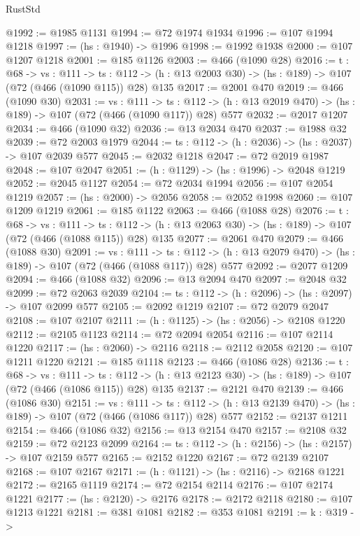 \begin{lexlean}{RustStd}
\begin{coremodule}
{\begin{coremodule}
{{{{@1992 := @1985 @1131
@1994 := @72 @1974 @1934
@1996 := @107 @1994 @1218
@1997 := (hs : @1940) -> @1996
@1998 := @1992 @1938
@2000 := @107 @1207 @1218
@2001 := @185 @1126
@2003 := @466 (@1090 @28)
@2016 := {t : @68} ->
  {vs : @111} ->
  {ts : @112} -> (h : @13 @2003 @30) -> (hs : @189) -> @107 (@72 (@466 (@1090 @115)) @28) @135
@2017 := @2001 @470
@2019 := @466 (@1090 @30)
@2031 := {vs : @111} ->
  {ts : @112} -> (h : @13 @2019 @470) -> (hs : @189) -> @107 (@72 (@466 (@1090 @117)) @28) @577
@2032 := @2017 @1207
@2034 := @466 (@1090 @32)
@2036 := @13 @2034 @470
@2037 := @1988 @32
@2039 := @72 @2003 @1979
@2044 := {ts : @112} -> (h : @2036) -> (hs : @2037) -> @107 @2039 @577
@2045 := @2032 @1218
@2047 := @72 @2019 @1987
@2048 := @107 @2047
@2051 := (h : @1129) -> (hs : @1996) -> @2048 @1219
@2052 := @2045 @1127
@2054 := @72 @2034 @1994
@2056 := @107 @2054 @1219
@2057 := (hs : @2000) -> @2056
@2058 := @2052 @1998
@2060 := @107 @1209 @1219
@2061 := @185 @1122
@2063 := @466 (@1088 @28)
@2076 := {t : @68} ->
  {vs : @111} ->
  {ts : @112} -> (h : @13 @2063 @30) -> (hs : @189) -> @107 (@72 (@466 (@1088 @115)) @28) @135
@2077 := @2061 @470
@2079 := @466 (@1088 @30)
@2091 := {vs : @111} ->
  {ts : @112} -> (h : @13 @2079 @470) -> (hs : @189) -> @107 (@72 (@466 (@1088 @117)) @28) @577
@2092 := @2077 @1209
@2094 := @466 (@1088 @32)
@2096 := @13 @2094 @470
@2097 := @2048 @32
@2099 := @72 @2063 @2039
@2104 := {ts : @112} -> (h : @2096) -> (hs : @2097) -> @107 @2099 @577
@2105 := @2092 @1219
@2107 := @72 @2079 @2047
@2108 := @107 @2107
@2111 := (h : @1125) -> (hs : @2056) -> @2108 @1220
@2112 := @2105 @1123
@2114 := @72 @2094 @2054
@2116 := @107 @2114 @1220
@2117 := (hs : @2060) -> @2116
@2118 := @2112 @2058
@2120 := @107 @1211 @1220
@2121 := @185 @1118
@2123 := @466 (@1086 @28)
@2136 := {t : @68} ->
  {vs : @111} ->
  {ts : @112} -> (h : @13 @2123 @30) -> (hs : @189) -> @107 (@72 (@466 (@1086 @115)) @28) @135
@2137 := @2121 @470
@2139 := @466 (@1086 @30)
@2151 := {vs : @111} ->
  {ts : @112} -> (h : @13 @2139 @470) -> (hs : @189) -> @107 (@72 (@466 (@1086 @117)) @28) @577
@2152 := @2137 @1211
@2154 := @466 (@1086 @32)
@2156 := @13 @2154 @470
@2157 := @2108 @32
@2159 := @72 @2123 @2099
@2164 := {ts : @112} -> (h : @2156) -> (hs : @2157) -> @107 @2159 @577
@2165 := @2152 @1220
@2167 := @72 @2139 @2107
@2168 := @107 @2167
@2171 := (h : @1121) -> (hs : @2116) -> @2168 @1221
@2172 := @2165 @1119
@2174 := @72 @2154 @2114
@2176 := @107 @2174 @1221
@2177 := (hs : @2120) -> @2176
@2178 := @2172 @2118
@2180 := @107 @1213 @1221
@2181 := @381 @1081
@2182 := @353 @1081
@2191 := {k : @319} ->
}}}}
\end{coremodule}}
\end{coremodule}
\end{lexlean}
